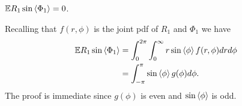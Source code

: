 \documentclass[draftcls, onecolumn, 11pt]{IEEEtran}
\begin{document}
\begin{lemma}\label{lem:expectImRfracpart}
${\mathbb E} R_1 \sin\left\langle \Phi_1 \right\rangle = 0$.
\end{lemma}
\begin{IEEEproof}
Recalling that $f(r,\phi)$ is the joint pdf of $R_1$ and $\Phi_1$ we have
\begin{align*}
{\mathbb E} R_1 \sin\left\langle \Phi_1 \right\rangle &= \int_{0}^{2\pi} \int_{0}^\infty r \sin\left\langle \phi \right\rangle f(r,\phi) dr d\phi \\
&= \int_{-\pi}^{\pi} \sin\left\langle \phi \right\rangle g(\phi) d\phi.
\end{align*}
The proof is immediate since $g(\phi)$ is even and $\sin\left\langle \phi \right\rangle$ is odd.
\end{IEEEproof}
\end{document}
